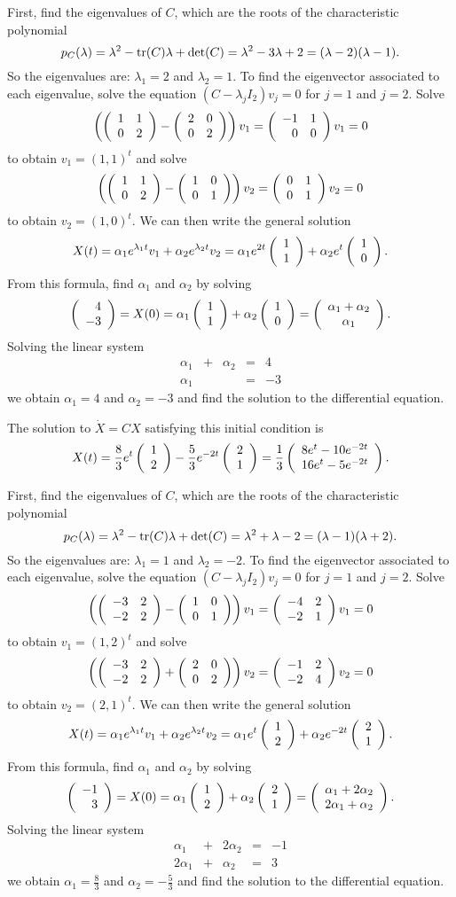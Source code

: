 \documentclass{ximera}
\begin{document}
\soln First, find the eigenvalues of $C$, which are the roots of the
characteristic polynomial
\[
p_C(\lambda) = \lambda^2 - {\rm tr}(C)\lambda + \det(C) =
\lambda^2 - 3\lambda + 2 = (\lambda - 2)(\lambda - 1).
\]
So the eigenvalues are: $\lambda_1 = 2$ and $\lambda_2 = 1$.
To find the eigenvector associated to each eigenvalue, solve
the equation $(C - \lambda_jI_2)v_j = 0$ for $j = 1$ and $j = 2$.  Solve
\[
\left(\left(\begin{array}{rr} 1 & 1\\ 0 &2\end{array}\right) - \left(\begin{array}{rr} 2 & 0\\ 0 &2\end{array}\right)\right)v_1 =
\left(\begin{array}{rr} -1 & 1\\ 0 &0\end{array}\right)v_1 = 0
\]
to obtain $v_1 = (1,1)^t$ and solve
\[
\left(\left(\begin{array}{rr} 1 & 1\\ 0 &2\end{array}\right) - \left(\begin{array}{rr} 1 & 0\\ 0 &1\end{array}\right)\right)v_2 =
\left(\begin{array}{rr} 0 & 1\\ 0 &1\end{array}\right)v_2 = 0
\]
to obtain $v_2 = (1,0)^t$.  We can then write the general solution
\[
X(t) = \alpha_1e^{\lambda_1 t}v_1 + \alpha_2e^{\lambda_2 t}v_2
= \alpha_1e^{2t}\left(\begin{array}{r} 1 \\ 1\end{array}\right) + \alpha_2e^t\left(\begin{array}{r} 1 \\ 0\end{array}\right).
\]
From this formula, find $\alpha_1$ and $\alpha_2$ by solving
\[
\left(\begin{array}{r} 4 \\ -3\end{array}\right) = X(0) = \alpha_1\left(\begin{array}{r} 1 \\ 1\end{array}\right) + \alpha_2\left(\begin{array}{r} 1 \\ 0\end{array}\right) =
\left(\begin{array}{c} \alpha_1 + \alpha_2 \\ \alpha_1\end{array}\right).
\]
Solving the linear system
\[
\begin{array}{rrrrr}
\alpha_1 & + & \alpha_2 & = & 4 \\
\alpha_1 & & & = & -3
\end{array}
\]
we obtain $\alpha_1 = 4$ and $\alpha_2 = -3$ and find the
solution to the differential equation.

 \ans The solution to $\dot{X} = CX$ satisfying this
initial condition is
\[
X(t) = \frac{8}{3}e^t\left(\begin{array}{r} 1 \\ 2\end{array}\right) - \frac{5}{3}e^{-2t}\left(\begin{array}{r} 2 \\ 1\end{array}\right)
= \frac{1}{3}\left(\begin{array}{c} 8e^t - 10e^{-2t} \\ 16e^t - 5e^{-2t}\end{array}\right).
\]

\soln First, find the eigenvalues of $C$, which are the roots of the
characteristic polynomial
\[
p_C(\lambda) = \lambda^2 - {\rm tr}(C)\lambda + \det(C) =
\lambda^2 + \lambda - 2 = (\lambda - 1)(\lambda + 2).
\]
So the eigenvalues are: $\lambda_1 = 1$ and $\lambda_2 = -2$.
To find the eigenvector associated to each eigenvalue, solve
the equation $(C - \lambda_jI_2)v_j = 0$ for $j = 1$ and $j = 2$.  Solve
\[
\left(\left(\begin{array}{rr} -3 & 2\\ -2 &2\end{array}\right) - \left(\begin{array}{rr} 1 & 0\\ 0 &1\end{array}\right)\right)v_1 =
\left(\begin{array}{rr} -4 & 2\\ -2 &1\end{array}\right)v_1 = 0
\]
to obtain $v_1 = (1,2)^t$ and solve
\[
\left(\left(\begin{array}{rr} -3 & 2\\ -2 &2\end{array}\right) + \left(\begin{array}{rr} 2 & 0\\ 0 &2\end{array}\right)\right)v_2 =
\left(\begin{array}{rr} -1 & 2\\ -2 &4\end{array}\right)v_2 = 0
\]
to obtain $v_2 = (2,1)^t$.  We can then write the general solution
\[
X(t) = \alpha_1e^{\lambda_1 t}v_1 + \alpha_2e^{\lambda_2 t}v_2
= \alpha_1e^t\left(\begin{array}{r} 1 \\ 2\end{array}\right) + \alpha_2e^{-2t}\left(\begin{array}{r} 2 \\ 1\end{array}\right).
\]
From this formula, find $\alpha_1$ and $\alpha_2$ by solving
\[
\left(\begin{array}{r} -1 \\ 3\end{array}\right) = X(0) = \alpha_1\left(\begin{array}{r} 1 \\ 2\end{array}\right) + \alpha_2\left(\begin{array}{r} 2 \\ 1\end{array}\right) =
\left(\begin{array}{c} \alpha_1 + 2\alpha_2 \\ 2\alpha_1 + \alpha_2\end{array}\right).
\]
Solving the linear system
\[
\begin{array}{rrrrr}
\alpha_1 & + & 2\alpha_2 & = & -1 \\
2\alpha_1 & + & \alpha_2 & = & 3
\end{array}
\]
we obtain $\alpha_1 = \frac{8}{3}$ and $\alpha_2 = -\frac{5}{3}$
and find the solution to the differential equation.
\end{document}
